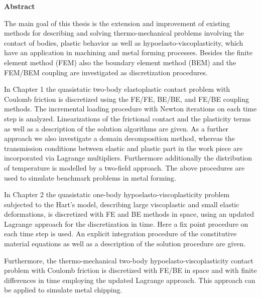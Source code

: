 \vspace*{-15.0mm}

 
 
 \begin{center}
 \sf \large
 \textbf{Abstract}
 \end{center}

\vspace*{-3.0mm}
The main goal of this thesis is the extension and improvement of  existing methods for  describing and solving thermo-mechanical  problems involving the contact of bodies, plastic behavior as well as hypoelasto-viscoplasticity, which have an application in machining and  metal forming processes. Besides the finite element method (FEM) also the boundary element method (BEM) and the FEM/BEM coupling are investigated as discretization procedures.

In Chapter 1 the quasistatic two-body elastoplastic contact problem with Coulomb friction is discretized using the FE/FE, BE/BE, and FE/BE coupling methods. The incremental loading procedure with Newton iterations on each time step is analyzed. Linearizations of the frictional contact and the plasticity terms as well as a description of the solution algorithms are given. As a further approach we also investigate a domain decomposition method, whereas the transmission conditions between elastic and plastic part in the work piece are incorporated via Lagrange multipliers. Furthermore additionally the distribution of temperature is modelled by a two-field approach. The above procedures are used to simulate benchmark problems in metal forming.

In Chapter 2 the quasistatic one-body hypoelasto-viscoplasticity problem subjected to the Hart's model, describing  large viscoplastic and small elastic deformations, is discretized with FE and BE methods in space, using an updated Lagrange approach for the discretization in time. Here a fix point  procedure  on each time step is used. An explicit integration procedure of the constitutive material equations  as well as a description of the solution procedure are given.

Furthermore, the thermo-mechanical  two-body hypoelasto-viscoplasticity contact problem with Coulomb friction  is discretized with FE/BE in space and with finite differences in time employing the updated Lagrange approach. This approach can be applied to simulate metal chipping.

